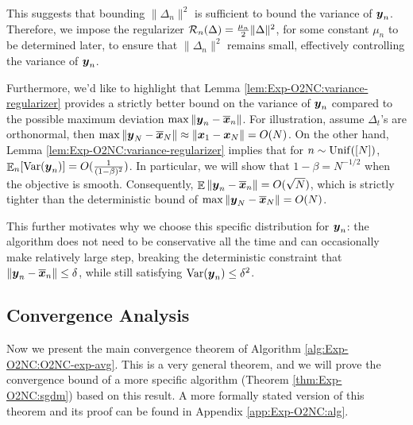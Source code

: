 This suggests that bounding $\|\Delta_n\|^2$ is sufficient to bound the variance of ${\boldsymbol{y}}_n$. Therefore, we impose the regularizer ${\cal R}_n(\Delta) = \frac{\mu_n}{2}\|\Delta\|^2$, for some constant $\mu_n$ to be determined later, to ensure that $\|\Delta_n\|^2$ remains small, effectively controlling the variance of ${\boldsymbol{y}}_n$. 

Furthermore, we'd like to highlight that Lemma \ref{lem:Exp-O2NC:variance-regularizer} provides a strictly better bound on the variance of ${\boldsymbol{y}}_n$ compared to the possible maximum deviation $\max\|{\boldsymbol{y}}_n-\overline{{\boldsymbol{x}}}_n\|$. For illustration, assume $\Delta_t$'s are orthonormal, then $\max\|{\boldsymbol{y}}_N-\overline{{\boldsymbol{x}}}_N\| \approx \|{\boldsymbol{x}}_1-{\boldsymbol{x}}_N\| = O(N)$. On the other hand, Lemma \ref{lem:Exp-O2NC:variance-regularizer} implies that for $n\sim\mathrm{Unif}([N])$, $\mathop{\mathbb{E}}_n[\mathop{\operatorname{Var}}({\boldsymbol{y}}_n)] = O(\frac{1}{(1-\beta)^2})$. In particular, we will show that $1-\beta= N^{-1/2}$ when the objective is smooth. Consequently, $\mathop{\mathbb{E}}\|{\boldsymbol{y}}_n-\overline{{\boldsymbol{x}}}_n\| = O(\sqrt{N})$, which is strictly tighter than the deterministic bound of $\max\|{\boldsymbol{y}}_N-\overline{{\boldsymbol{x}}}_N\| = O(N)$.

This further motivates why we choose this specific distribution for ${\boldsymbol{y}}_n$: the algorithm does not need to be conservative all the time and can occasionally make relatively large step, breaking the deterministic constraint that $\|{\boldsymbol{y}}_n-\overline{{\boldsymbol{x}}}_n\|\le\delta$, while still satisfying $\mathop{\operatorname{Var}}({\boldsymbol{y}}_n)\le\delta^2$.





\subsection{Convergence Analysis}
\label{sec:Exp-O2NC_alg-conv}

Now we present the main convergence theorem of Algorithm \ref{alg:Exp-O2NC:O2NC-exp-avg}. This is a very general theorem, and we will prove the convergence bound of a more specific algorithm (Theorem \ref{thm:Exp-O2NC:sgdm}) based on this result. A more formally stated version of this theorem and its proof can be found in Appendix \ref{app:Exp-O2NC:alg}.  

